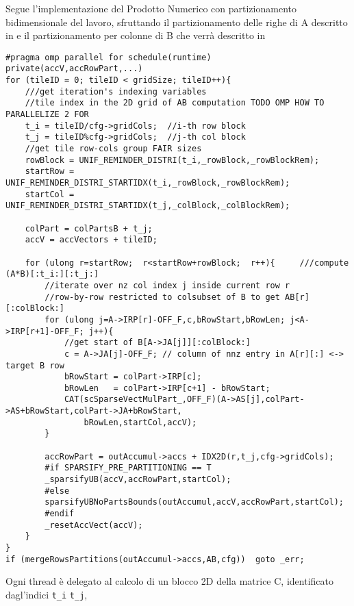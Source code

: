 \clearpage
Segue l'implementazione del Prodotto Numerico con partizionamento bidimensionale del lavoro,
sfruttando il partizionamento delle righe di A descritto in 
e il partizionamento per colonne di B che verrà descritto in 
\begin{lstlisting}
#pragma omp parallel for schedule(runtime) private(accV,accRowPart,...)
for (tileID = 0; tileID < gridSize; tileID++){
    ///get iteration's indexing variables
    //tile index in the 2D grid of AB computation TODO OMP HOW TO PARALLELIZE 2 FOR
    t_i = tileID/cfg->gridCols;  //i-th row block
    t_j = tileID%cfg->gridCols;  //j-th col block
    //get tile row-cols group FAIR sizes
    rowBlock = UNIF_REMINDER_DISTRI(t_i,_rowBlock,_rowBlockRem); 
    startRow = UNIF_REMINDER_DISTRI_STARTIDX(t_i,_rowBlock,_rowBlockRem);
    startCol = UNIF_REMINDER_DISTRI_STARTIDX(t_j,_colBlock,_colBlockRem);
    
    colPart = colPartsB + t_j;
    accV = accVectors + tileID; 
     
    for (ulong r=startRow;  r<startRow+rowBlock;  r++){		///compute (A*B)[:t_i:][:t_j:]
        //iterate over nz col index j inside current row r
        //row-by-row restricted to colsubset of B to get AB[r][:colBlock:]
        for (ulong j=A->IRP[r]-OFF_F,c,bRowStart,bRowLen; j<A->IRP[r+1]-OFF_F; j++){
            //get start of B[A->JA[j]][:colBlock:]
            c = A->JA[j]-OFF_F; // column of nnz entry in A[r][:] <-> target B row
            bRowStart = colPart->IRP[c];
            bRowLen   = colPart->IRP[c+1] - bRowStart;
            CAT(scSparseVectMulPart_,OFF_F)(A->AS[j],colPart->AS+bRowStart,colPart->JA+bRowStart,
                bRowLen,startCol,accV);
        }

        accRowPart = outAccumul->accs + IDX2D(r,t_j,cfg->gridCols);
        #if SPARSIFY_PRE_PARTITIONING == T
        _sparsifyUB(accV,accRowPart,startCol);
        #else
        sparsifyUBNoPartsBounds(outAccumul,accV,accRowPart,startCol);
        #endif
        _resetAccVect(accV);
    }
}
if (mergeRowsPartitions(outAccumul->accs,AB,cfg))  goto _err;
\end{lstlisting}
Ogni thread è delegato al calcolo di un blocco 2D della matrice C,
identificato dagl'indici \verb|t_i| \verb|t_j|, 
